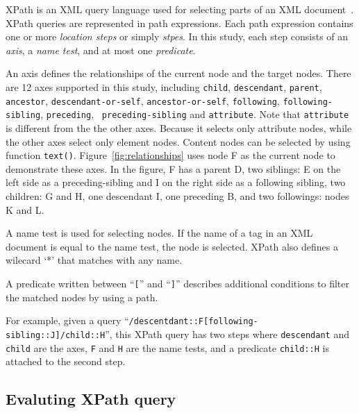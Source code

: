 XPath is an XML query language used for selecting parts of an XML
document~\cite{xpath}. XPath queries are represented in path expressions. Each
path expression contains one or more \emph{location steps} or simply
\emph{stpes}. In this study, each step consists of an \emph{axis}, a \emph{name
test}, and at most one \emph{predicate}.

An axis defines the relationships of the current node and the target nodes.
There are 12 axes supported in this study, including  \texttt{child},
\texttt{descendant}, \texttt{parent}, \texttt{ancestor},
\texttt{descendant-or-self}, \texttt{ancestor-or-self}, \texttt{following},
\texttt{following-sibling}, \texttt{preceding}, \texttt{ preceding-sibling}  and
\texttt{attribute}. Note that \texttt{attribute} is different from the the other
axes. Because it selects only attribute nodes, while the other axes select only
element nodes. Content nodes can be selected by using function \texttt{text()}.
Figure~\ref{fig:relationships} uses node F as the current node to demonstrate
these axes. In the figure, F has a parent D, two siblings: E  on the left side
as a preceding-sibling and I on the right side as a following sibling, two
children: G and H, one descendant I, one preceding B, and two followings: nodes
K and L.

A name test is used for selecting nodes. If the name of a tag in an XML document
is equal to the name test, the node is selected. XPath also defines a wilecard  `*'
that matches with any name.

A predicate written between ``\verb|[|'' and ``\verb|]|'' describes additional
conditions to filter the matched nodes by using a path.

For example, given a query
``\verb|/descentdant::F[following-sibling::J]/child::H|'', this XPath query has
two steps where \verb|descendant| and \verb|child| are the axes, \verb|F| and
\verb|H| are the name tests, and a predicate \verb|child::H| is attached to the
second step.

\subsection{Evaluting XPath query}


